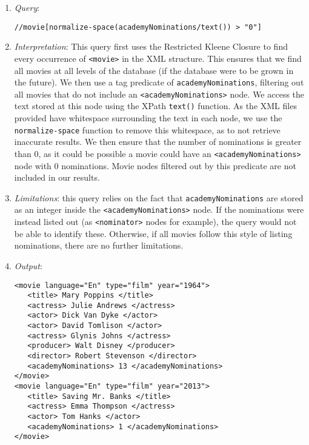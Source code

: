 \documentclass[11pt]{article}
\begin{document}
\begin{enumerate}
\item \textit{Query}:
\begin{small}
\begin{verbatim}
//movie[normalize-space(academyNominations/text()) > "0"]
\end{verbatim}
\end{small}
\item \textit{Interpretation}: This query first uses the Restricted Kleene Closure to find every occurrence of \texttt{<movie>} in the XML structure. This ensures that we find all movies at all levels of the database (if the database were to be grown in the future). We then use a tag predicate of \texttt{academyNominations}, filtering out all movies that do not include an \texttt{<academyNominations>} node. We access the text stored at this node using the XPath \texttt{text()} function. As the XML files provided have whitespace surrounding the text in each node, we use the \texttt{normalize-space} function to remove this whitespace, as to not retrieve inaccurate results. We then ensure that the number of nominations is greater than 0, as it could be possible a movie could have an \texttt{<academyNominations>} node with 0 nominations. Movie nodes filtered out by this predicate are not included in our results.
\item \textit{Limitations}: this query relies on the fact that \texttt{academyNominations} are stored as an integer inside the \texttt{<academyNominations>} node. If the nominations were instead listed out (as \texttt{<nominator>} nodes for example), the query would not be able to identify these. Otherwise, if all movies follow this style of listing nominations, there are no further limitations.
\item \textit{Output}:
\begin{verbatim}
<movie language="En" type="film" year="1964">
   <title> Mary Poppins </title>
   <actress> Julie Andrews </actress>
   <actor> Dick Van Dyke </actor>
   <actor> David Tomlison </actor>
   <actress> Glynis Johns </actress>
   <producer> Walt Disney </producer>
   <director> Robert Stevenson </director>
   <academyNominations> 13 </academyNominations>
</movie>
<movie language="En" type="film" year="2013">
   <title> Saving Mr. Banks </title>
   <actress> Emma Thompson </actress>
   <actor> Tom Hanks </actor>
   <academyNominations> 1 </academyNominations>
</movie>
\end{verbatim} 
\end{enumerate}
\end{document}
